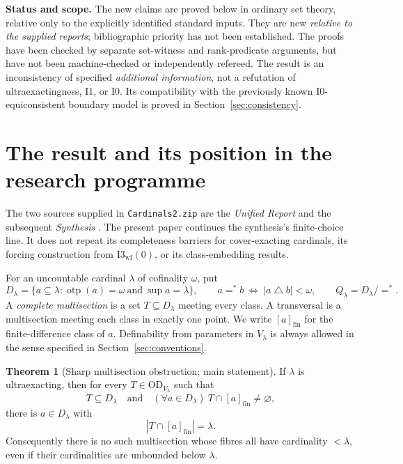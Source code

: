 \documentclass[11pt,letterpaper]{article}
\theoremstyle{definition}
\newtheorem{theorem}[definition]{Theorem}
\numberwithin{equation}{section}
\newcommand{\OD}{\mathrm{OD}}
\newcommand{\Izero}{\mathrm{I0}}
\newcommand{\eqfin}{\mathrel{=^{*}}}
\newcommand{\cl}[1]{[#1]_{\mathrm{fin}}}
\newcommand{\Ione}{\mathrm{I1}}
\newcommand{\otp}{\operatorname{otp}}
\newcommand{\symdiff}{\mathbin{\triangle}}
\begin{document}
\textbf{Status and scope.}
The new claims are proved below in ordinary set theory, relative only to the explicitly identified standard inputs. They are new \emph{relative to the supplied reports}; bibliographic priority has not been established. The proofs have been checked by separate set-witness and rank-predicate arguments, but have not been machine-checked or independently refereed. The result is an inconsistency of specified \emph{additional information}, not a refutation of ultraexactingness, $\Ione$, or $\Izero$. Its compatibility with the previously known $\Izero$-equiconsistent boundary model is proved in Section~\ref{sec:consistency}.

\newpage
\tableofcontents

\newpage
\section{The result and its position in the research programme}\label{sec:overview}

The two sources supplied in \nolinkurl{Cardinals2.zip} are the \emph{Unified Report} and the subsequent \emph{Synthesis} \cite{unified,synthesis}. The present paper continues the synthesis's finite-choice line. It does not repeat its completeness barriers for cover-exacting cardinals, its forcing construction from $\mathrm{I3}_{\mathrm{wf}}(0)$, or its class-embedding results.

For an uncountable cardinal $\lambda$ of cofinality $\omega$, put
\[
 D_\lambda=\{a\subseteq\lambda:\otp(a)=\omega\ \text{and}\ \sup a=\lambda\},
 \qquad a\eqfin b\ \Longleftrightarrow\ |a\symdiff b|<\omega,
 \qquad Q_\lambda=D_\lambda/{\eqfin}.
\]
A \emph{complete multisection} is a set $T\subseteq D_\lambda$ meeting every class. A transversal is a multisection meeting each class in exactly one point. We write $\cl a$ for the finite-difference class of $a$. Definability from parameters in $V_\lambda$ is always allowed in the sense specified in Section~\ref{sec:conventions}.

\begin{theorem}[Sharp multisection obstruction; main statement]\label{thm:mainintro}
If $\lambda$ is ultraexacting, then for every $T\in\OD_{V_\lambda}$ such that
\[
 T\subseteq D_\lambda\quad\text{and}\quad
 (\forall a\in D_\lambda)\ T\cap\cl a\ne\varnothing,
\]
there is $a\in D_\lambda$ with
\begin{equation}\label{eq:mainintro}
 |T\cap\cl a|=\lambda.
\end{equation}
Consequently there is no such multisection whose fibres all have cardinality $<\lambda$, even if their cardinalities are unbounded below $\lambda$.
\end{theorem}
\end{document}
